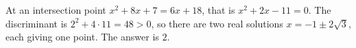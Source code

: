 At an intersection point $x^2+8x+7=6x+18$, that is $x^2+2x-11=0$. The discriminant is $2^2+4\cdot11=48>0$, so there are two real solutions $x=-1\pm2\sqrt3$, each giving one point. The answer is $\boxed{2}$.
